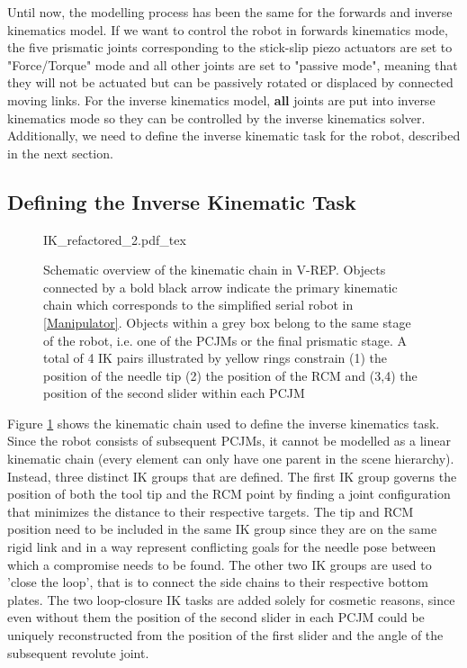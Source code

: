 Until now, the modelling process has been the same for the forwards and inverse kinematics model. If we want to control the robot in forwards kinematics mode, the five prismatic joints corresponding to the stick-slip piezo actuators are set to "Force/Torque" mode and all other joints are set to "passive mode", meaning that they will not be actuated but can be passively rotated or displaced by connected moving links. For the inverse kinematics model, \textbf{all} joints are put into inverse kinematics mode so they can be controlled by the inverse kinematics solver. Additionally, we need to define the inverse kinematic task for the robot, described in the next section.

\subsection{Defining the Inverse Kinematic Task}

\begin{figure}[h!]
	{IK_refactored_2.pdf_tex}
	\caption{Schematic overview of the kinematic chain in V-REP. Objects connected by a bold black arrow indicate the primary kinematic chain which corresponds to the simplified serial robot in \ref{Manipulator}. Objects within a grey box belong to the same stage of the robot, i.e. one of the PCJMs or the final prismatic stage. A total of 4 IK pairs illustrated by yellow rings constrain (1) the position of the needle tip (2) the position of the RCM and (3,4) the position of the second slider within each PCJM}
	\label{IK_chain}
\end{figure}

Figure \ref{IK_chain} shows the kinematic chain used to define the inverse kinematics task. Since the robot consists of subsequent PCJMs, it cannot be modelled as a linear kinematic chain (every element can only have one parent in the scene hierarchy). Instead, three distinct IK groups that are defined. The first IK group governs the position of both the tool tip and the RCM point by finding a joint configuration that minimizes the distance to their respective targets. The tip and RCM position need to be included in the same IK group since they are on the same rigid link and in a way represent conflicting goals for the needle pose between which a compromise needs to be found. The other two IK groups are used to 'close the loop', that is to connect the side chains to their respective bottom plates. The two loop-closure IK tasks are added solely for cosmetic reasons, since even without them the position of the second slider in each PCJM could be uniquely reconstructed from the position of the first slider and the angle of the subsequent revolute joint.